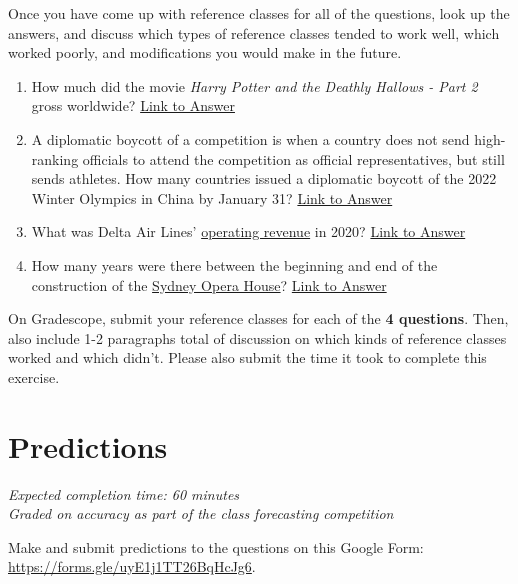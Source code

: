 \documentclass[11pt]{article}
\begin{document}
Once you have come up with reference classes for all of the questions, look up the answers, and discuss which types of reference classes tended to work well, which worked poorly, and modifications you would make in the future. 

\begin{enumerate}
	\item How much did the movie \emph{Harry Potter and the Deathly Hallows - Part 2} gross worldwide? \href{https://en.wikipedia.org/wiki/Harry_Potter_and_the_Deathly_Hallows_%E2%80%93_Part_2#Box_office}{Link to Answer}
	\item A diplomatic boycott of a competition is when a country does not send high-ranking officials to attend the competition as official representatives, but still sends athletes. How many countries issued a diplomatic boycott of the 2022 Winter Olympics in China by January 31? \href{https://en.wikipedia.org/wiki/2022_Winter_Olympics#Diplomatic_boycotts}{Link to Answer}
	\item What was Delta Air Lines' \href{https://www.investopedia.com/terms/o/operating-revenue.asp}{operating revenue} in 2020? \href{https://ir.delta.com/news/news-details/2021/Delta-Air-Lines-Announces-December-Quarter-and-Full-Year-2020-Financial-Results/default.aspx}{Link to Answer}
	\item How many years were there between the beginning and end of the construction of the \href{https://en.wikipedia.org/wiki/Sydney_Opera_House#/media/File:Sydney_Australia._(21339175489).jpg}{Sydney Opera House}? \href{https://en.wikipedia.org/wiki/Sydney_Opera_House}{Link to Answer}
	
\end{enumerate}

On Gradescope, submit your reference classes for each of the \textbf{4 questions}. Then, also include 1-2 paragraphs total of discussion on which kinds of reference classes worked and which didn't. Please also submit the time it took to complete this exercise.

\section*{Predictions} 

\emph{Expected completion time: 60 minutes} \\
\emph{Graded on accuracy as part of the class forecasting competition}

Make and submit predictions to the questions on this Google Form: \\ \url{https://forms.gle/uyE1j1TT26BqHcJg6}.
\end{document}
